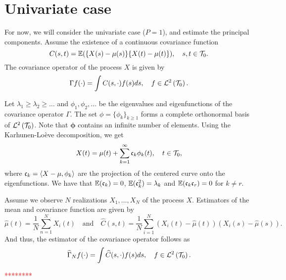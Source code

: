 \section{Univariate case} %
\label{sec:univariate_case}

For now, we will consider the univariate case ($P = 1$), and estimate the principal components. Assume the existence of a continuous covariance function 
\begin{equation}\label{eq:cov_func}
    C(s, t) = \mathbb{E}(\{X(s) - \mu(s)\}\{X(t) - \mu(t)\}), \quad s, t \in \mathcal{T}_{0}.
\end{equation}
The covariance operator of the process $X$ is given by
\begin{equation}\label{eq:cov_op}
    \Gamma f(\cdot) = \int C(s, \cdot)f(s)ds, \quad f \in \mathcal{L}^{2}\left(\mathcal{T}_{0}\right).
\end{equation}

Let $\lambda_1 \geq \lambda_2 \geq \dots$ and $\phi_1, \phi_2, \dots$ be the eigenvalues and eigenfunctions of the covariance operator $\Gamma$. The set $\phi = \{\phi_k\}_{k \geq 1}$ forms a complete orthonormal basis of $\mathcal{L}^{2}\left(\mathcal{T}_{0}\right)$. Note that $\mathbf{\phi}$ contains an infinite number of elements. Using the Karhunen-Loève decomposition, we get
\begin{equation}\label{eq:kl_expansion}
    X(t) = \mu(t) + \sum_{k = 1}^{\infty} \mathfrak{c}_{k}\phi_k(t), \quad t \in \mathcal{T}_{0},
\end{equation}
where $\mathfrak{c}_{k} = \langle X - \mu, \phi_k\rangle$ are the projection of the centered curve onto the eigenfunctions. We have that $\mathbb{E}(\mathfrak{c}_{k}) = 0$, $\mathbb{E}(\mathfrak{c}_{k}^2) = \lambda_k$ and $\mathbb{E}(\mathfrak{c}_{k}\mathfrak{c}_{r}) = 0$ for $k \neq r$.

Assume we observe $N$ realizations $X_1, \dots, X_N$ of the process $X$. Estimators of the mean and covariance function are given by
\begin{equation}
    \widehat{\mu}(t) = \frac{1}{N}\sum_{n = 1}^N X_i(t) \quad\text{and}\quad \widehat{C}(s, t) = \frac{1}{N}\sum_{i = 1}^N \left(X_i(t) - \widehat{\mu}(t)\right)\left(X_i(s) - \widehat{\mu}(s)\right).
\end{equation}
And thus, the estimator of the covariance operator follows as
\begin{equation}
    \widehat{\Gamma}_N f(\cdot) = \int \widehat{C}(s, \cdot)f(s)ds, \quad f \in \mathcal{L}^{2}\left(\mathcal{T}_{0}\right).
\end{equation}


\textcolor{red}{********}

